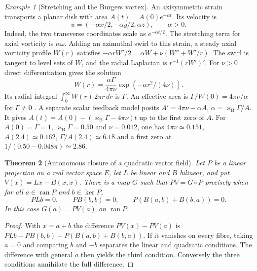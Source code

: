 \documentclass[aps,pra,onecolumn,superscriptaddress,nofootinbib,10pt]{revtex4-2}
\newtheorem{theorem}{Theorem}
\theoremstyle{definition}
\theoremstyle{remark}
\newtheorem{example}[theorem]{Example}
\begin{document}
\begin{example}[Stretching and the Burgers vortex]
\label{ob:stretch}
An axisymmetric strain transports a planar disk with area
$A(t)=A(0)e^{-\alpha t}$. Its velocity is
\[
 u=(-\alpha x/2,-\alpha y/2,\alpha z),\qquad \alpha>0.
\]
Indeed, the two transverse coordinates scale as $e^{-\alpha t/2}$.
The stretching term for axial vorticity is $\alpha\omega$. Adding an
azimuthal swirl to this strain, a steady axial vorticity profile $W(r)$
satisfies
$-\alpha r W'/2=\alpha W+\nu(W''+W'/r)$.
The swirl is tangent to level sets of $W$, and the radial Laplacian
is $r^{-1}(rW')'$. For $\nu>0$ direct differentiation gives the solution
\[
 W(r)=\frac{\alpha\Gamma}{4\pi\nu}\exp(-\alpha r^2/(4\nu)).
\]
Its radial integral $\int_0^\infty W(r)\,2\pi r\,dr$ is $\Gamma$.
An effective area is $\Gamma/W(0)=4\pi\nu/\alpha$ for $\Gamma\ne0$
\cite{obr:Burgers}. A separate scalar feedback model posits
$A'=4\pi\nu-\alpha A$, $\alpha=\varkappa_{\mathrm B}\Gamma/A$. It gives
$A(t)=A(0)-(\varkappa_{\mathrm B}\Gamma-4\pi\nu)t$ up to the first zero of $A$.
For $A(0)=\Gamma=1$, $\varkappa_{\mathrm B}\Gamma=0.50$ and $\nu=0.012$,
one has $4\pi\nu\simeq0.151$, $A(2.4)\simeq0.162$,
$\Gamma/A(2.4)\simeq6.18$ and a first zero at
$1/(0.50-0.048\pi)\simeq2.86$.
\end{example}

\begin{theorem}[Autonomous closure of a quadratic vector field]
\label{ob:quadraticclosure}
Let $P$ be a linear projection on a real vector space $E$, let $L$
be linear and $B$ bilinear, and put $V(x)=Lx-B(x,x)$. There is a map $G$
such that $PV=G\circ P$ precisely when for all $a\in\operatorname{ran}P$
and $b\in\ker P$,
\[
 PLb=0,\qquad PB(b,b)=0,\qquad P(B(a,b)+B(b,a))=0 .
\]
In this case $G(a)=PV(a)$ on $\operatorname{ran}P$.
\end{theorem}
\begin{proof}
With $x=a+b$ the difference $PV(x)-PV(a)$ is
$PLb-PB(b,b)-P(B(a,b)+B(b,a))$. If it vanishes on every fibre, taking $a=0$
and comparing $b$ and $-b$ separates the linear and quadratic conditions.
The difference with general $a$ then yields the third condition.
Conversely the three conditions annihilate the full difference.
\end{proof}
\end{document}
